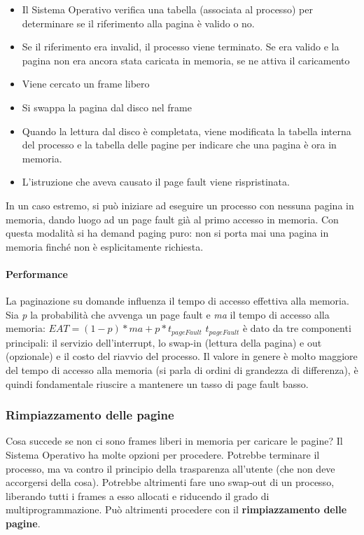 \documentclass[a4paper]{article}
\begin{document}
\begin{itemize}
    \item Il Sistema Operativo verifica una tabella (associata al processo) per determinare se il riferimento alla pagina è valido o no.
    \item Se il riferimento era invalid, il processo viene terminato. Se era valido e la pagina non era ancora stata caricata in memoria, se ne attiva il caricamento
    \item Viene cercato un frame libero
    \item Si swappa la pagina dal disco nel frame
    \item Quando la lettura dal disco è completata, viene modificata la tabella interna del processo e la tabella delle pagine per indicare che una pagina è ora in memoria.
    \item L'istruzione che aveva causato il page fault viene rispristinata.
\end{itemize}
In un caso estremo, si può iniziare ad eseguire un processo con nessuna pagina in memoria, dando luogo ad un page fault già al primo accesso in memoria. Con questa modalità si ha demand paging puro: non si porta mai una pagina in memoria finché non è esplicitamente richiesta.

\paragraph{Performance}
La paginazione su domande influenza il tempo di accesso effettiva alla memoria. Sia \textit p la probabilità che avvenga un page fault e \textit{ma} il tempo di accesso alla memoria:
$ EAT = (1-p) * ma + p * t_{pageFault} $
$ t_{pageFault} $ è dato da tre componenti principali: il servizio dell'interrupt, lo swap-in (lettura della pagina) e out (opzionale) e il costo del riavvio del processo. Il valore in genere è molto maggiore del tempo di accesso alla memoria (si parla di ordini di grandezza di differenza), è quindi fondamentale riuscire a mantenere un tasso di page fault basso.

\subsubsection{Rimpiazzamento delle pagine}
Cosa succede se non ci sono frames liberi in memoria per caricare le pagine? Il Sistema Operativo ha molte opzioni per procedere. Potrebbe terminare il processo, ma va contro il principio della trasparenza all'utente (che non deve accorgersi della cosa). Potrebbe altrimenti fare uno swap-out di un processo, liberando tutti i frames a esso allocati e riducendo il grado di multiprogrammazione. Può altrimenti procedere con il \textbf{rimpiazzamento delle pagine}.
\end{document}
